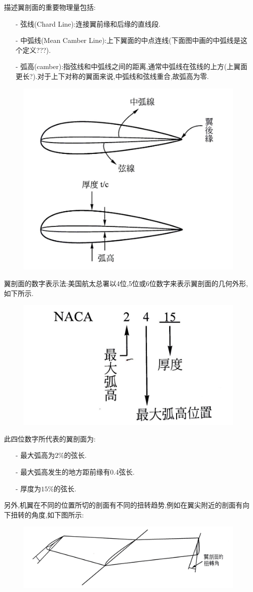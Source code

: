 \documentclass[9pt, oneside]{book}
\begin{document}
描述翼剖面的重要物理量包括:
\begin{itemize}
    \item [-] 弦线(Chard Line):连接翼前缘和后缘的直线段.
    \item [-] 中弧线(Mean Camber Line):上下翼面的中点连线\textcolor[rgb]{1,0,0}{(下面图中画的中弧线是这个定义???)}.
    \item [-] 弧高(camber):指弦线和中弧线之间的距离,通常中弧线在弦线的上方(上翼面更长?).对于上下对称的翼面来说,中弧线和弦线重合,故弧高为零.
\end{itemize}

\begin{figure}[H]
    \centering
    \includegraphics[width=0.5\linewidth]{image/2-7.jpg}
\end{figure}

翼剖面的数字表示法:美国航太总署以4位,5位或6位数字来表示翼剖面的几何外形,如下所示.
\begin{figure}[H]
    \centering
    \includegraphics[width=0.3\linewidth]{image/表示法.jpg}
\end{figure}

此四位数字所代表的翼剖面为:

\begin{itemize}
    \item [-] 最大弧高为$2\%$的弦长.
    \item [-] 最大弧高发生的地方距前缘有0.4弦长.
    \item [-] 厚度为$15\%$的弦长.
\end{itemize}

另外,机翼在不同的位置所切的剖面有不同的扭转趋势,例如在翼尖附近的剖面有向下扭转的角度,如下图所示:
\begin{figure}[H]
    \centering
    \includegraphics[width=0.6\linewidth]{image/2-8.jpg}
\end{figure}
\end{document}
